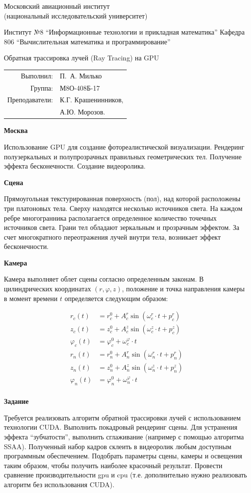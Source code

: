 \documentclass[12pt]{article}
\newcommand{\makemytitlepagee}[1]{
        \thispagestyle{empty}
        \begin{center}
                \bfseries

                {\Large Московский авиационный институт\\ (национальный исследовательский университет)

                }

                \vspace{48pt}

                {\large
                        Институт №8 ``Информационные технологии и прикладная математика''
                        Кафедра 806 ``Вычислительная математика и программирование''
                }

                \vspace{36pt}

                \vspace{48pt}

                {#1}

        \end{center}

        \vspace{72pt}

        \begin{flushright}
                \begin{tabular}{rl}
                        Выполнил:      & П.\, А. Милько      \\
                        Группа:        & М8О-408Б-17         \\
                        Преподаватели: & К.Г. Крашенинников, \\
                                       & А.Ю. Морозов.       \\
                \end{tabular}
        \end{flushright}

        \vfill

        \begin{center}
                \bfseries
                Москва\\
                \the\year
        \end{center}
        \newpage
        \setcounter{page}{1}
}
\begin{document}
\makemytitlepagee{Обратная трассировка лучей (Ray Tracing) на GPU}

Использование GPU для создание фотореалистической визуализации.
Рендеринг полузеркальных и полупрозрачных правильных геометрических тел.
Получение эффекта бесконечности. Создание видеоролика.



\textbf{Сцена}

Прямоугольная текстурированная поверхность (пол), над которой
расположены три платоновых тела. Сверху находятся несколько источников света. На
каждом ребре многогранника располагается определенное количество точечных
источников света. Грани тел обладают зеркальным и прозрачным эффектом. За счет
многократного переотражения лучей внутри тела, возникает эффект бесконечности.

\textbf{Камера}

Камера выполняет облет сцены согласно определенным законам. В
цилиндрических координатах $(r,\varphi,z)$, положение и точка направления камеры в
момент времени $t$ определяется следующим образом:

\begin{equation*}
	\begin{split}
		r_c(t) &=r_c^0+A_c^r \sin(\omega_c^r\cdot t + p_c^r) \\
		z_c(t) &=z_c^0+A_c^z \sin(\omega_c^z\cdot t + p_c^z) \\
		\varphi_c(t) &= \varphi_c^0 +\omega_c^\varphi \cdot t \\
		r_n(t) &=r_n^0+A_n^r \sin(\omega_n^r\cdot t + p_n^r) \\
		z_n(t) &=z_n^0+A_n^z \sin(\omega_n^z\cdot t + p_n^z) \\
		\varphi_n(t) &= \varphi_n^0 +\omega_n^\varphi \cdot t \\
	\end{split}
\end{equation*}

\textbf{Задание}

Требуется реализовать алгоритм обратной трассировки лучей с использованием технологии CUDA.
Выполнить покадровый рендеринг сцены. Для устранения эффекта ``зубчатости'',
выполнить сглаживание (например с помощью алгоритма SSAA).
Полученный набор кадров склеить в видеоролик любым доступным программным обеспечением.
Подобрать параметры сцены, камеры и освещения таким образом, чтобы получить наиболее красочный результат.
Провести сравнение производительности gpu и cpu (т.е. дополнительно нужно реализовать алгоритм без использования CUDA).
\end{document}
